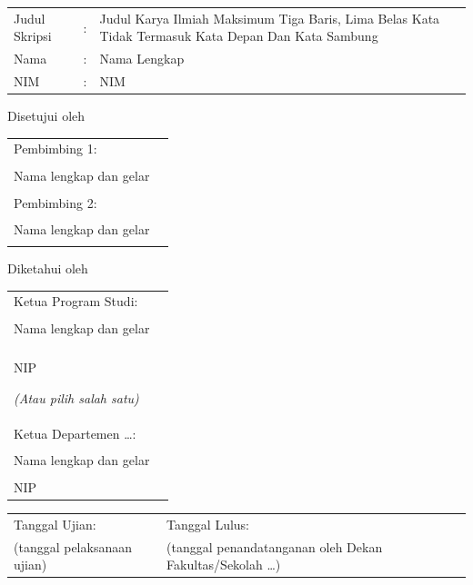 
\clearpage
\thispagestyle{empty}

\noindent
{\fontsize{12pt}{14pt}\selectfont
\begin{tabular}{@{}p{2.5cm}p{0.3cm}p{}@{}}
Judul Skripsi & : & Judul Karya Ilmiah Maksimum Tiga Baris, Lima Belas Kata Tidak Termasuk Kata Depan Dan Kata Sambung \\
Nama & : & Nama Lengkap \\
NIM  & : & NIM \\
\end{tabular}
}

\vspace{2cm}

\begin{center}
Disetujui oleh
\end{center}

\vspace{0.5cm}

\noindent
\begin{tabular}{@{}p{}@{}p{}@{}}
Pembimbing 1: & \\
\hspace{0.5cm}Nama lengkap dan gelar & \hfill\rule{4cm}{0.4pt} \\[1cm]
Pembimbing 2: & \\
\hspace{0.5cm}Nama lengkap dan gelar & \hfill\rule{4cm}{0.4pt} \\
\end{tabular}

\vspace{2cm}

\begin{center}
Diketahui oleh
\end{center}

\vspace{0.5cm}

\noindent
\begin{tabular}{@{}p{}@{}p{}@{}}
Ketua Program Studi: & \\ 
\hspace{0.5cm}Nama lengkap dan gelar & \hfill\rule{4cm}{0.4pt} \\
\hspace{0.5cm}NIP

\textit{(Atau pilih salah satu)} & \\

Ketua Departemen \ldots: & \\
\hspace{0.5cm}Nama lengkap dan gelar & \hfill\rule{4cm}{0.4pt} \\
\hspace{0.5cm}NIP & \\
\end{tabular}

\vfill

\noindent
\begin{tabular}{@{}p{}@{}p{}@{}}
Tanggal Ujian: & Tanggal Lulus: \\
{\fontsize{9pt}{11pt}\selectfont (tanggal pelaksanaan ujian)} &
{\fontsize{9pt}{11pt}\selectfont (tanggal penandatanganan oleh Dekan Fakultas/Sekolah \ldots)} \\
\end{tabular}
